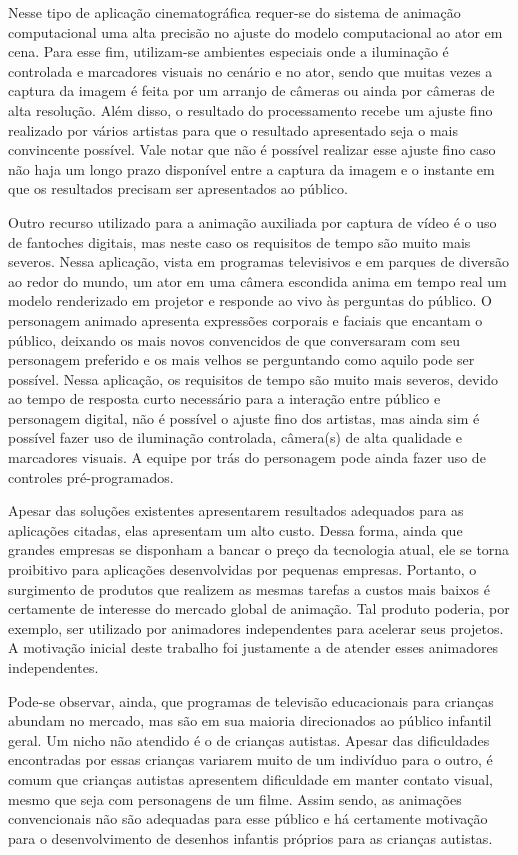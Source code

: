 Nesse tipo de aplicação cinematográfica requer-se do sistema de animação
computacional uma alta precisão no ajuste do modelo computacional ao ator em
cena. Para esse fim, utilizam-se ambientes especiais onde a iluminação é
controlada e marcadores visuais no cenário e no ator, sendo que muitas vezes a
captura da imagem é feita por um arranjo de câmeras ou ainda por câmeras de alta
resolução. Além disso, o resultado do processamento recebe um ajuste fino
realizado por vários artistas para que o resultado apresentado seja o mais
convincente possível. Vale notar que não é possível realizar esse ajuste fino
caso não haja um longo prazo disponível entre a captura da imagem e o instante
em que os resultados precisam ser apresentados ao público.

Outro recurso utilizado para a animação auxiliada por captura de vídeo é o uso
de fantoches digitais, mas neste caso os requisitos de tempo são muito mais
severos. Nessa aplicação, vista em programas televisivos e em parques de
diversão ao redor do mundo, um ator em uma câmera escondida anima em tempo real
um modelo renderizado em projetor e responde ao vivo às perguntas do público. O
personagem animado apresenta expressões corporais e faciais que encantam o
público, deixando os mais novos convencidos de que conversaram com seu
personagem preferido e os mais velhos se perguntando como aquilo pode ser
possível. Nessa aplicação, os requisitos de tempo são muito mais severos, devido
ao tempo de resposta curto necessário para a interação entre público e
personagem digital, não é possível o ajuste fino dos artistas, mas ainda sim é
possível fazer uso de iluminação controlada, câmera(s) de alta qualidade e
marcadores visuais. A equipe por trás do personagem pode ainda fazer uso de
controles pré-programados.

Apesar das soluções existentes apresentarem resultados adequados para as
aplicações citadas, elas apresentam um alto custo. Dessa forma, ainda que
grandes empresas se disponham a bancar o preço da tecnologia atual, ele se torna
proibitivo para aplicações desenvolvidas por pequenas empresas. Portanto, o
surgimento de produtos que realizem as mesmas tarefas a custos mais baixos é
certamente de interesse do mercado global de animação. Tal produto poderia, por
exemplo, ser utilizado por animadores independentes para acelerar seus projetos.
A motivação inicial deste trabalho foi justamente a de atender esses animadores
independentes.

Pode-se observar, ainda, que programas de televisão educacionais para crianças
abundam no mercado, mas são em sua maioria direcionados ao público infantil
geral. Um nicho não atendido é o de crianças autistas. Apesar das dificuldades
encontradas por essas crianças variarem muito de um indivíduo para o outro, é
comum que crianças autistas apresentem dificuldade em manter contato visual,
mesmo que seja com personagens de um filme. Assim sendo, as animações
convencionais não são adequadas para esse público e há certamente motivação para
o desenvolvimento de desenhos infantis próprios para as crianças autistas.

